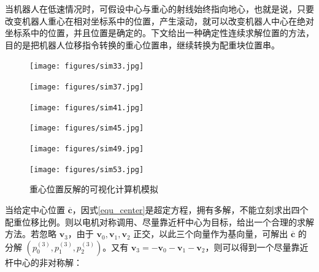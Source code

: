 \documentclass[a4paper]{ctexart}
\numberwithin{equation}{section}
\numberwithin{table}{section}
\numberwithin{figure}{section}
\begin{document}
当机器人在低速情况时，可假设中心与重心的射线始终指向地心，也就是说，只要改变机器人重心在相对坐标系中的位置，产生滚动，就可以改变机器人中心在绝对坐标系中的位置，并且位置是确定的。下文给出一种确定性连续求解位置的方法，目的是把机器人位移指令转换的重心位置串，继续转换为配重块位置串。


\begin{figure}[H]
  \begin{minipage}{0.32\linewidth}
    \begin{center}
      \texttt{[image: figures/sim33.jpg]}
    \end{center}
  \end{minipage}
  \hfill
  \begin{minipage}{0.32\linewidth}
    \begin{center}
      \texttt{[image: figures/sim37.jpg]}
    \end{center}
  \end{minipage}
  \hfill
  \begin{minipage}{0.32\linewidth}
    \begin{center}
      \texttt{[image: figures/sim41.jpg]}
    \end{center}
  \end{minipage}
  \vfill
  \begin{minipage}{0.32\linewidth}
    \begin{center}
      \texttt{[image: figures/sim45.jpg]}
    \end{center}
  \end{minipage}
  \hfill
  \begin{minipage}{0.32\linewidth}
    \begin{center}
      \texttt{[image: figures/sim49.jpg]}
    \end{center}
  \end{minipage}
  \hfill
  \begin{minipage}{0.32\linewidth}
    \begin{center}
      \texttt{[image: figures/sim53.jpg]}
    \end{center}
  \end{minipage}
  \caption{重心位置反解的可视化计算机模拟}
\end{figure}

当给定中心位置 $\overline{\boldsymbol c}$，因式\ref{equ_center}是超定方程，拥有多解，不能立刻求出四个配重位移比例。则以电机对称调用、尽量靠近杆中心为目标，给出一个合理的求解方法。若忽略 $\boldsymbol v_3$，由于 $\boldsymbol v_0,\boldsymbol v_1,\boldsymbol v_2$ 正交，以此三个向量作为基向量，可解出 $\overline{\boldsymbol c}$ 的分解 $\left(p_0^{(3)},p_1^{(3)},p_2^{(3)}\right)$。又有 $\boldsymbol v_3 = - \boldsymbol v_0 -\boldsymbol v_1-\boldsymbol v_2$，则可以得到一个尽量靠近杆中心的非对称解：
\end{document}
